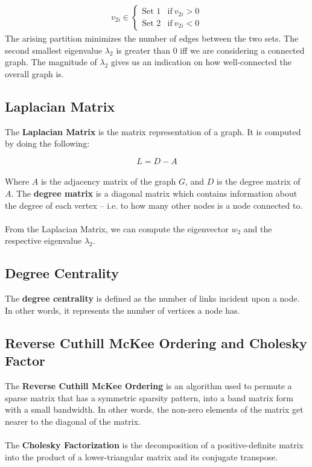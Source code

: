 \documentclass{article}
\begin{document}
\begin{align*}
	v_{2i} \in \begin{cases} \text{Set 1} & \text{if}~ v_{2i} > 0 \\ \text{Set 2} & \text{if}~ v_{2i} < 0 \end{cases}
\end{align*}
The arising partition minimizes the number of edges between the two sets. The second smallest eigenvalue $\lambda_2$ is greater than 0 iff we are considering a connected graph. The magnitude of $\lambda_2$ gives us an indication on how well-connected the overall graph is.

\subsection{Laplacian Matrix}
The \textbf{Laplacian Matrix} is the matrix representation of a graph. It is computed by doing the following:

\[ L = D - A \] \\
Where $A$ is the adjacency matrix of the graph $G$, and $D$ is the degree matrix of $A$. The \textbf{degree matrix} is a diagonal matrix which contains information about the degree of each vertex -- i.e. to how many other nodes is a node connected to. \\ \\
From the Laplacian Matrix, we can compute the eigenvector $w_2$ and the respective eigenvalue $\lambda_2$.

\subsection{Degree Centrality}
The \textbf{degree centrality} is defined as the number of links incident upon a node. In other words, it represents the number of vertices a node has.

\subsection{Reverse Cuthill McKee Ordering and Cholesky Factor}
The \textbf{Reverse Cuthill McKee Ordering} is an algorithm used to permute a sparse matrix that has a symmetric sparsity pattern, into a band matrix form with a small bandwidth. In other words, the non-zero elements of the matrix get nearer to the diagonal of the matrix. \\ \\
The \textbf{Cholesky Factorization} is the decomposition of a positive-definite matrix into the product of a lower-triangular matrix and its conjugate transpose.
\end{document}
